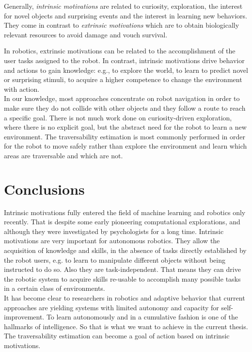 \documentclass[12pt,a4paper,table,dvipsnames,tikz]{report}
\newcommand{\term}{\textit}
\begin{document}
	Generally, \term{intrinsic motivations} are related to curiosity, exploration, 
	the interest for novel objects and surprising events and the interest in 
	learning new behaviors. They come in contrast to \term{extrinsic motivations} 
	which are to obtain biologically relevant resources to avoid damage and vouch 
	survival.
	\par
	In robotics, extrinsic motivations can be related to the accomplishment of the 
	user tasks assigned to the robot. In contrast, intrinsic motivations drive 
	behavior and actions to gain knowledge: e.g., to explore the world, to learn to 
	predict novel or surprising stimuli, to acquire a higher competence to change 
	the environment with action.
	\\
	
	In our knowledge, most approaches concentrate on robot navigation in order to 
	make sure they do not collide with other objects and they follow a route to 
	reach a specific goal. There is not much work done on curiosity-driven 
	exploration, where there is no explicit goal, but the abstract need for the 
	robot to learn a new environment. The traversability estimation is most commonly 
	performed in order for the robot to move safely rather than explore the 
	environment and learn which areas are traversable and which are not.
	\\
		
	\section{Conclusions}
	\label{sec:bg:concl}
	
	Intrinsic motivations fully entered the field of machine learning and robotics 
	only recently. That is despite some early pioneering computational explorations, 
	and although they were investigated by psychologists for a long time. Intrinsic 
	motivations are very important for autonomous robotics. They allow the acquisition 
	of knowledge and skills, in the absence of tasks directly established by the robot 
	users, e.g. to learn to manipulate different objects without being instructed to 
	do so. Also they are task-independent. That means they can drive the robotic system 
	to acquire skills re-usable to accomplish many possible tasks in a certain class 
	of environments.
	\\
	
	It has become clear to researchers in robotics and adaptive behavior that 
	current approaches are yielding systems with limited autonomy and capacity for 
	self-improvement. To learn autonomously and in a cumulative fashion is one of 
	the hallmarks of intelligence. So that is what we want to achieve in the current 
	thesis. The traversability estimation can become a goal of action based on 
	intrinsic motivations.
	\\
	
\end{document}
